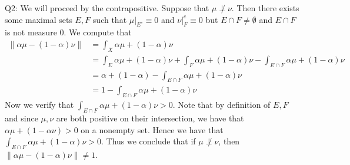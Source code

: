 \documentclass[letterpaper]{article}
\newcommand{\norm}[1]{\left\lVert#1\right\rVert}
\begin{document}
\noindent
Q2: We will proceed by the contrapositive. Suppose that $\mu \not \perp \nu$. Then there exists some maximal sets $E,F$ such that $\mu |_{E^c} \equiv 0$ and $\nu|_F^c \equiv 0$ but $E\cap F \neq \emptyset$ and $E\cap F$ is not measure 0. We compute that 
\begin{align*} 
\norm{\alpha \mu - (1 - \alpha) \nu}  &= \int_{X} \alpha \mu + (1-\alpha) \nu
\\ & = \int_E \alpha \mu + (1-\alpha) \nu + \int_F \alpha \mu + (1-\alpha) \nu - \int_{E\cap F} \alpha \mu + (1-\alpha) \nu
\\ & = \alpha +(1-\alpha) - \int_{E \cap F}\alpha \mu + (1-\alpha) \nu
\\ & = 1 - \int_{E \cap F}\alpha \mu + (1-\alpha) \nu
\end{align*}
Now we verify that $\int_{E \cap F}\alpha \mu + (1-\alpha) \nu >0$. Note that by definition of $E,F$ and since $\mu,\nu$ are both positive on their intersection, we have that $\alpha \mu +(1- \alpha \nu) >0$ on a nonempty set. 
Hence we have that $\int_{E \cap F}\alpha \mu + (1-\alpha) \nu >0$. Thus we conclude that if $ \mu \not \perp \nu$, then $\norm{\alpha \mu -(1 - \alpha) \nu} \neq 1$. 
\end{document}
